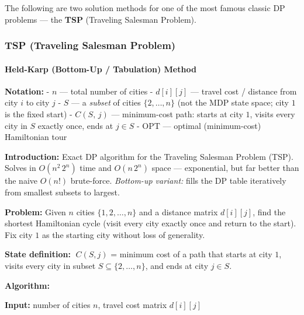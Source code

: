 \documentclass[11pt]{article}
\begin{document}
The following are two solution methods for one of the most famous
classic DP problems --- the \textbf{TSP} (Traveling Salesman Problem).

    \clearpage

\subsubsection{\texorpdfstring{\textbf{TSP} (Traveling Salesman
Problem)}{TSP (Traveling Salesman Problem)}}\label{tsp-traveling-salesman-problem}

    \label{held-karp-bottom-up}

    \paragraph{Held-Karp (Bottom-Up / Tabulation)
Method}\label{held-karp-bottom-up-tabulation-method}

    \textbf{Notation:} - \(n\) --- total number of cities - \(d[i][j]\) ---
travel cost / distance from city \(i\) to city \(j\) - \(S\) --- a
\emph{subset} of cities \(\{2,\ldots,n\}\) (not the MDP state space;
city \(1\) is the fixed start) - \(C(S,\,j)\) --- minimum-cost path:
starts at city \(1\), visits every city in \(S\) exactly once, ends at
\(j \in S\) - \(\text{OPT}\) --- optimal (minimum-cost) Hamiltonian tour

    \label{intro-1-3}

    \textbf{Introduction:} Exact DP algorithm for the Traveling Salesman
Problem (TSP). Solves in \(O(n^2\, 2^n)\) time and \(O(n\, 2^n)\) space
--- exponential, but far better than the naive \(O(n!)\) brute-force.
\emph{Bottom-up variant:} fills the DP table iteratively from smallest
subsets to largest.

\textbf{Problem:} Given \(n\) cities \(\{1, 2, \ldots, n\}\) and a
distance matrix \(d[i][j]\), find the shortest Hamiltonian cycle (visit
every city exactly once and return to the start). Fix city \(1\) as the
starting city without loss of generality.

\textbf{State definition:} \(\;C(S, j)\) = minimum cost of a path that
starts at city \(1\), visits every city in subset
\(S \subseteq \{2, \ldots, n\}\), and ends at city \(j \in S\).

    \textbf{Algorithm:}

\textbf{Input:} number of cities \(n\), travel cost matrix \(d[i][j]\)
\end{document}
